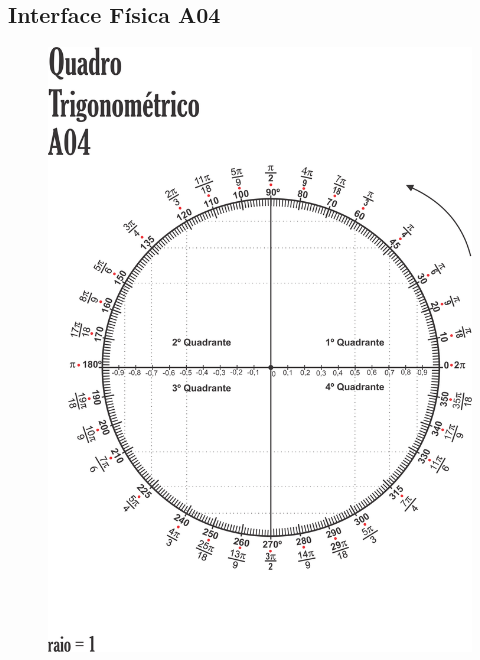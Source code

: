\subsection{Interface Física A04}\label{subsection:atividade3_A04}
\begin{figure}[htb]
	\centering
	\includegraphics[width=0.9\linewidth]{chapters/appendixLesson/Interface_A04.png}
\end{figure}
\clearpage

